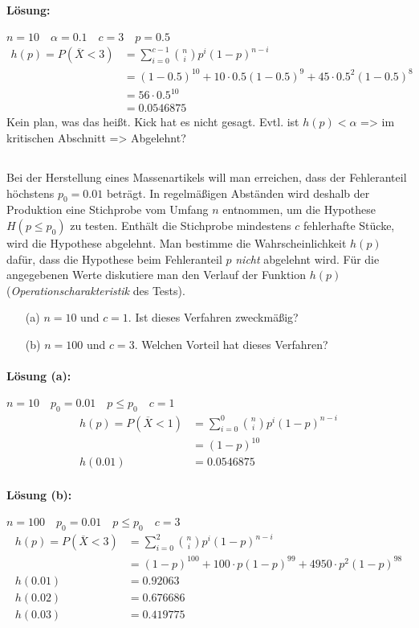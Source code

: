 \documentclass[ngerman]{scrartcl}
\begin{document}
\paragraph{Lösung:} $n=10 \quad \alpha = 0.1 \quad c=3 \quad p=0.5$
\begin{align*}
	h(p)=P(\overline{X}<3)&=\sum_{i=0}^{c-1}{n\choose i}p^i(1-p)^{n-i}\\
	&=(1-0.5)^{10}+10\cdot 0.5(1-0.5)^9+45\cdot 0.5^2(1-0.5)^8\\
	&=56\cdot 0.5^{10}\\
	&=0.0546875
\end{align*}
Kein plan, was das heißt. Kick hat es nicht gesagt. Evtl. ist $h(p)<\alpha$ => im kritischen Abschnitt => Abgelehnt?


\subsection{}
Bei der Herstellung eines Massenartikels will man erreichen, dass der Fehleranteil höchstens $p_0=0.01$ beträgt. In regelmäßigen Abständen wird deshalb der Produktion eine Stichprobe vom Umfang $n$ entnommen, um die Hypothese $H(p\leq p_0)$ zu testen. Enthält die Stichprobe mindestens $c$ fehlerhafte Stücke, wird die Hypothese abgelehnt. Man bestimme die Wahrscheinlichkeit $h(p)$ dafür, dass die Hypothese beim Fehleranteil $p$ \textit{nicht} abgelehnt wird. Für die angegebenen Werte diskutiere man den Verlauf der Funktion $h(p)$ (\textit{Operationscharakteristik} des Tests).
\begin{enumerate}
	\item[(a)] $n=10$ und $c=1$. Ist dieses Verfahren zweckmäßig?
	\item[(b)] $n=100$ und $c=3$. Welchen Vorteil hat dieses Verfahren?
\end{enumerate}
\paragraph{Lösung (a):} $n=10 \quad p_0 = 0.01 \quad p\leq p_0 \quad c=1$
\begin{align*}
	h(p)=P(\overline{X}<1)&=\sum_{i=0}^{0}{n\choose i}p^i(1-p)^{n-i}\\
	&=(1-p)^{10}\\
	h(0.01)&=0.0546875
\end{align*}


\paragraph{Lösung (b):} $n=100 \quad p_0 = 0.01 \quad p\leq p_0 \quad c=3$
\begin{align*}
	h(p)=P(\overline{X}<3)&=\sum_{i=0}^{2}{n\choose i}p^i(1-p)^{n-i}\\
	&=(1-p)^{100}+100\cdot p(1-p)^{99}+4950\cdot p^2(1-p)^{98}\\
	h(0.01)&=0.92063\\
	h(0.02)&=0.676686\\
	h(0.03)&=0.419775
\end{align*}
\end{document}
